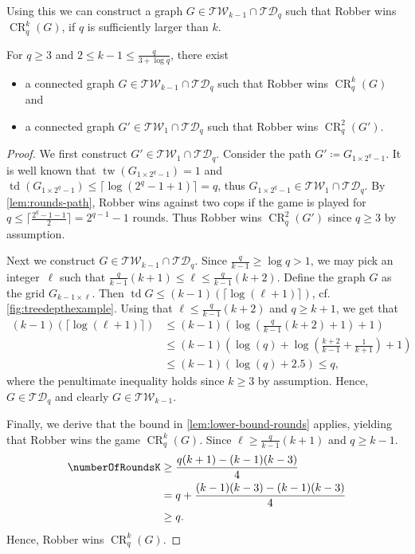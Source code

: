 \documentclass[a4paper,UKenglish,cleveref, autoref, thm-restate]{lipics-v2021}
\newcommand{\TW}{\ensuremath{\mathcal{TW}}}
\newcommand{\TD}{\ensuremath{\mathcal{TD}}}
\DeclareMathOperator{\CR}{CR}
\DeclareMathOperator{\tw}{tw}
\DeclareMathOperator{\td}{td}
\newcommand{\grid}[2]{\ensuremath{G_{#1 \times #2}}}
\begin{document}
Using this we can construct a graph $G\in\TW_{k-1}\cap\TD_q$ such that Robber wins $\CR_q^k(G)$, if $q$ is sufficiently larger than $k$.

\begin{lemma}
	\label{lem:CR_tw-td}
	For $q\geq 3$ and $2\leq k-1\leq\frac{q}{3 +\log q}$, there exist
	\begin{itemize}
		\item a connected graph $G\in\TW_{k-1}\cap\TD_q$ such that Robber wins $\CR_q^k(G)$ and
		\item a connected graph $G'\in \TW_{1}\cap\TD_q$ such that Robber wins $\CR_q^2(G')$.
	\end{itemize}
\end{lemma}

\begin{proof}
	We first construct $G'\in \TW_{1}\cap\TD_q$.
	Consider the path $G'\coloneqq\grid{1}{2^q-1}$.
	It is well known that $\tw(\grid{1}{2^q-1})=1$ and $\td(\grid{1}{2^q-1})\leq \lceil \log(2^q-1+1)\rceil = q$, thus $\grid{1}{2^q-1}\in \TW_{1}\cap\TD_q$.
	By \cref{lem:rounds-path}, Robber wins against two cops if the game is played for $q \leq \lceil \frac{2^q-1-1}{2}\rceil=2^{q-1} -1$ rounds.
	Thus Robber wins $\CR_q^2(G')$ since $q \geq 3$ by assumption.
	
	Next we construct $G\in\TW_{k-1}\cap\TD_q$.
	Since $\frac{q}{k-1} \geq \log q > 1$, we may pick an integer~$\ell$ such that $\frac{q}{k-1}(k+1) \leq \ell \leq \frac{q}{k-1}(k+2)$.  
	Define the graph $G$ as the grid $\grid{k-1}{\ell}$.
	Then $\td G \leq (k-1)(\lceil \log (\ell+1)\rceil)$, cf.\@ \cref{fig:treedepthexample}.
	Using that $\ell \leq \frac{q}{k-1}(k+2)$ and $q \geq k+1$, we get that 
	\begin{align*}
	(k-1)(\lceil \log (\ell+1)\rceil) &\leq (k-1)\left( \log \left(\frac{q}{k-1}(k+2) + 1 \right)+1\right)\\
	&\leq (k-1)\left( \log (q)+\log\left(\frac{k+2}{k-1} + \frac{1}{k+1} \right)+1\right)\\
	&\leq (k-1)\left( \log (q)+2.5 \right) \leq q,
	\end{align*}
	where the penultimate inequality holds since $k \geq 3$ by assumption.
	Hence, $G \in \TD_q$ and clearly $G \in \TW_{k-1}$.
	
	Finally, we derive that the bound in \cref{lem:lower-bound-rounds} applies, yielding that Robber wins the game $\CR_q^k(G)$.
	Since $\ell \geq \frac{q}{k-1}(k+1)$ and $q \geq k-1$.
	\begin{align*}
		\numberOfRoundsK 
		& \geq \frac{q(k+1) - (k-1)(k-3)}{4} \\ 
		& = q + \frac{(k-1)(k-3) - (k-1)(k-3)}{4} \\
		& \geq q.
	\end{align*}
	Hence, Robber wins $\CR_q^k(G)$.
\end{proof}
\end{document}
